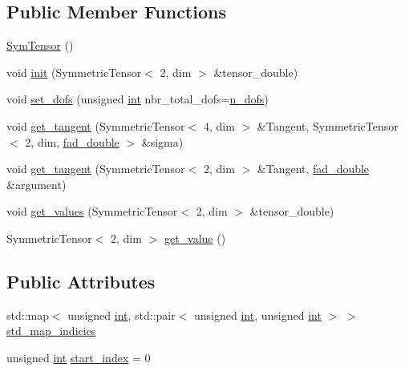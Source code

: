 \subsection*{Public Member Functions}
\begin{DoxyCompactItemize}
\item 
\hyperlink{classSacado__Wrapper_1_1SymTensor_a4e7ec32177eb891e3f1a32a16bcd59f5}{Sym\+Tensor} ()
\item 
void \hyperlink{classSacado__Wrapper_1_1SymTensor_acbad579d5ead9e96ff46aa15d9b5aef4}{init} (Symmetric\+Tensor$<$ 2, dim $>$ \&tensor\+\_\+double)
\item 
void \hyperlink{classSacado__Wrapper_1_1SymTensor_aa9e0fcc9d4e0a4120bedb8ef9b8d7ecb}{set\+\_\+dofs} (unsigned \hyperlink{CMakeCache_8txt_a79a3d8790b2588b09777910863574e09}{int} nbr\+\_\+total\+\_\+dofs=\hyperlink{classSacado__Wrapper_1_1SymTensor_a733bc4b029ff8d067b48e7ce3ee7606b}{n\+\_\+dofs})
\item 
void \hyperlink{classSacado__Wrapper_1_1SymTensor_ab97427c3b5cab279e58607cf431ab262}{get\+\_\+tangent} (Symmetric\+Tensor$<$ 4, dim $>$ \&Tangent, Symmetric\+Tensor$<$ 2, dim, \hyperlink{Sacado__example_8cc_a868b94676739e612d9c95940e70892a9}{fad\+\_\+double} $>$ \&sigma)
\item 
void \hyperlink{classSacado__Wrapper_1_1SymTensor_ac0ab9caa8c54102e24c4d007f820873b}{get\+\_\+tangent} (Symmetric\+Tensor$<$ 2, dim $>$ \&Tangent, \hyperlink{Sacado__example_8cc_a868b94676739e612d9c95940e70892a9}{fad\+\_\+double} \&argument)
\item 
void \hyperlink{classSacado__Wrapper_1_1SymTensor_afbab1ce0f846f026f5bd8b449180b5e9}{get\+\_\+values} (Symmetric\+Tensor$<$ 2, dim $>$ \&tensor\+\_\+double)
\item 
Symmetric\+Tensor$<$ 2, dim $>$ \hyperlink{classSacado__Wrapper_1_1SymTensor_ade8f6c8cb25c2b6e2baac06ef638c293}{get\+\_\+value} ()
\end{DoxyCompactItemize}
\subsection*{Public Attributes}
\begin{DoxyCompactItemize}
\item 
std\+::map$<$ unsigned \hyperlink{CMakeCache_8txt_a79a3d8790b2588b09777910863574e09}{int}, std\+::pair$<$ unsigned \hyperlink{CMakeCache_8txt_a79a3d8790b2588b09777910863574e09}{int}, unsigned \hyperlink{CMakeCache_8txt_a79a3d8790b2588b09777910863574e09}{int} $>$ $>$ \hyperlink{classSacado__Wrapper_1_1SymTensor_ae3b1c56cde3fc5c7805b618ef3d9de75}{std\+\_\+map\+\_\+indicies}
\item 
unsigned \hyperlink{CMakeCache_8txt_a79a3d8790b2588b09777910863574e09}{int} \hyperlink{classSacado__Wrapper_1_1SymTensor_afe921e6044e4110fcfc848c52844d650}{start\+\_\+index} = 0
\end{DoxyCompactItemize}
